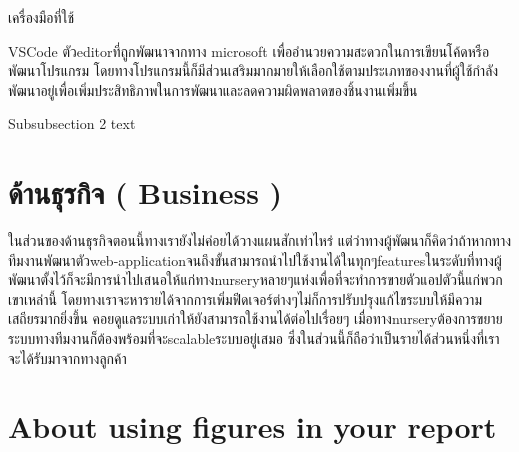 เครื่องมือที่ใช้

VSCode
		ตัวeditorที่ถูกพัฒนาจากทาง microsoft เพื่ออำนวยความสะดวกในการเขียนโค้ดหรือพัฒนาโปรแกรม โดยทางโปรแกรมนี้ก็มีส่วนเสริมมากมายให้เลือกใช้ตามประเภทของงานที่ผู้ใช้กำลังพัฒนาอยู่เพื่อเพิ่มประสิทธิภาพในการพัฒนาและลดความผิดพลาดของชิ้นงานเพิ่มขึ้น







Subsubsection 2 text

\section{ ด้านธุรกิจ ( Business )
}
ในส่วนของด้านธุรกิจตอนนี้ทางเรายังไม่ค่อยได้วางแผนสักเท่าไหร่ แต่ว่าทางผู้พัฒนาก็คิดว่าถ้าหากทางทีมงานพัฒนาตัวweb-applicationจนถึงขั้นสามารถนำไปใช้งานได้ในทุกๆfeaturesในระดับที่ทางผู้พัฒนาตั้งไว้ก็จะมีการนำไปเสนอให้แก่ทางnurseryหลายๆแห่งเพื่อที่จะทำการขายตัวแอปตัวนี้แก่พวกเขาเหล่านี้ โดยทางเราจะหารายได้จากการเพิ่มฟีดเจอร์ต่างๆไม่ก็การปรับปรุงแก้ไขระบบให้มีความเสถียรมากยิ่งขึ้น คอยดูแลระบบเก่าให้ยังสามารถใช้งานได้ต่อไปเรื่อยๆ 	เมื่อทางnurseryต้องการขยายระบบทางทีมงานก็ต้องพร้อมที่จะscalableระบบอยู่เสมอ ซึ่งในส่วนนี้ก็ถือว่าเป็นรายได้ส่วนหนึ่งที่เราจะได้รับมาจากทางลูกค้า


\section{About using figures in your report}

\newcommand{\loremipsum}{
  \textit{Lorem ipsum dolor sit amet, consectetur adipisicing elit, sed do
  eiusmod tempor incididunt ut labore et dolore magna aliqua. Ut enim ad
  minim veniam, quis nostrud exercitation ullamco laboris nisi ut
  aliquip ex ea commodo consequat. Duis aute irure dolor in
  reprehenderit in voluptate velit esse cillum dolore eu fugiat nulla
  pariatur. Excepteur sint occaecat cupidatat non proident, sunt in
  culpa qui officia deserunt mollit anim id est laborum.}\par}

